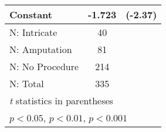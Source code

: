 {\begin{tabular}{l*{1}{cc}}
Constant            &      -1.723\sym{*}  &     (-2.37)\\
\hline
N: Intricate        &          40         &            \\
N: Amputation       &          81         &            \\
N: No Procedure     &         214         &            \\
N: Total            &         335         &            \\
\hline\hline
\multicolumn{3}{l}{\footnotesize \textit{t} statistics in parentheses}\\
\multicolumn{3}{l}{\footnotesize \sym{*} \(p<0.05\), \sym{**} \(p<0.01\), \sym{***} \(p<0.001\)}\\
\end{tabular}
}
